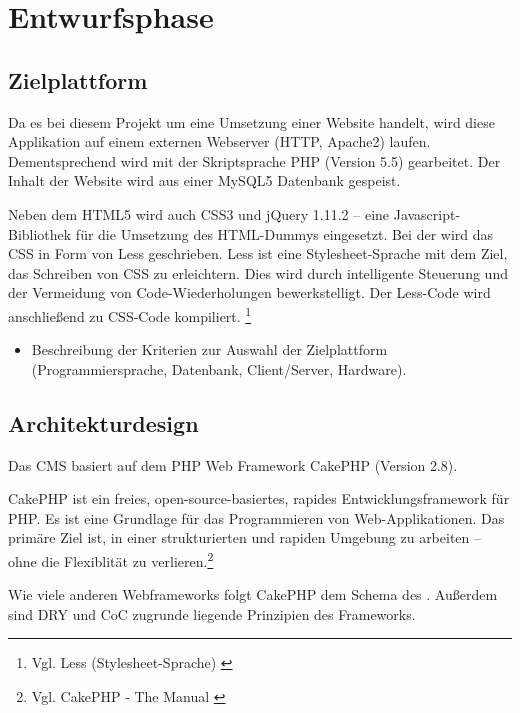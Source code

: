 \section{Entwurfsphase} 
\label{sec:Entwurfsphase}

\subsection{Zielplattform}
\label{sec:Zielplattform}
Da es bei diesem Projekt um eine Umsetzung einer Website handelt, wird diese
Applikation auf einem externen Webserver (\ac{HTTP}, Apache2) laufen.
Dementsprechend wird mit der Skriptsprache \ac{PHP} (Version 5.5) gearbeitet. Der Inhalt der Website wird aus
einer MySQL5 Datenbank gespeist.

Neben dem HTML5 wird auch
\ac{CSS}3 und jQuery 1.11.2 -- eine Javascript-Bibliothek für die Umsetzung des
HTML-Dummys eingesetzt. Bei der \mh wird das \ac{CSS} in Form von Less
geschrieben. Less ist eine Stylesheet-Sprache mit dem Ziel, das Schreiben von
CSS zu erleichtern. Dies wird durch intelligente Steuerung und der Vermeidung von 
Code-Wiederholungen bewerkstelligt. Der Less-Code wird anschließend
zu CSS-Code kompiliert.  \footnote{Vgl. Less (Stylesheet-Sprache)
\cite{wiki:Less_(Stylesheet-Sprache)}}

\begin{itemize}
	\item Beschreibung der Kriterien zur Auswahl der Zielplattform (\ua Programmiersprache, Datenbank, Client/Server, Hardware).
\end{itemize}


\subsection{Architekturdesign}
\label{sec:Architekturdesign}
Das \ac{CMS} \ct basiert auf dem \ac{PHP} Web Framework CakePHP (Version 2.8).

CakePHP ist ein freies, open-source-basiertes, rapides Entwicklungsframework für
PHP.
Es ist eine Grundlage für das Programmieren von Web-Applikationen.
Das primäre Ziel ist, in einer strukturierten und rapiden Umgebung zu arbeiten
 -- ohne die Flexiblität zu verlieren.\footnote{Vgl. CakePHP - The Manual
 \cite{CakePHP}}

Wie viele anderen Webframeworks folgt CakePHP dem Schema des
. Außerdem sind \ac{DRY}
und \ac{CoC} zugrunde liegende Prinzipien des Frameworks.

